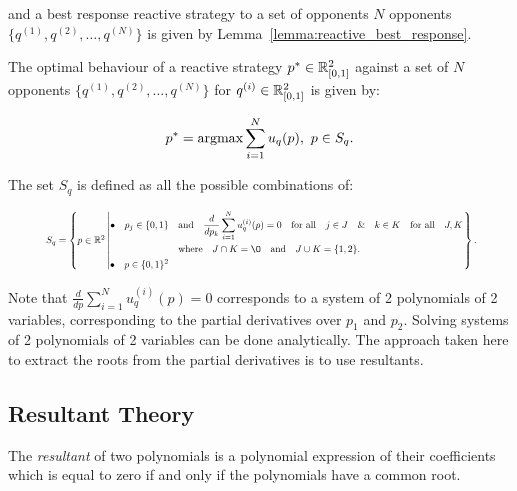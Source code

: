 and a best response reactive strategy to a set of opponents \(N\) opponents
\(\{q^{(1)}, q^{(2)}, \dots, q^{(N)} \}\) is given by
Lemma~\ref{lemma:reactive_best_response}.

\begin{lemma}\label{lemma:reactive_best_response}
    The optimal behaviour of a reactive strategy
    \(p^* \in \mathbb{R}_{[0, 1]} ^ 2\)
    against a set of \(N\) opponents \(\{q^{(1)}, q^{(2)}, \dots, q^{(N)} \}\)
    for \(q^{(i)} \in \mathbb{R}_{[0, 1]} ^ 2\) is given by:

    \[p^* = \textnormal{argmax}\sum\limits_{i=1} ^ N  u_q(p), \ p \in S_q.\]

    The set \(S_q\) is defined as all the possible combinations of:
    
    \begin{equation}\label{eq:s_q_reactive_set}
        \resizebox{.9\linewidth}{!}{ $
        S_q =
        \left\{p \in \mathbb{R} ^ 2 \left|
            \begin{aligned}
                \bullet\quad p_j \in \{0, 1\} & \quad \text{and} \quad \frac{d}{dp_k} 
                \sum\limits_{i=1} ^ N  u_q^{(i)}(p) = 0
                \quad \text{for all} \quad j \in J \quad \&  \quad k \in K  \quad \text{for all} \quad J, K \\
                & \quad \text{where} \quad J \cap K = \O \quad
                \text{and} \quad J \cup K = \{1, 2\}.\\
                \bullet\quad  p \in \{0, 1\} ^ 2
            \end{aligned}\right.
        \right\}.
        $}
    \end{equation}
\end{lemma}

Note that \(\frac{d}{dp} \sum\limits_{i=1} ^ N  u_q^{(i)}(p) = 0\) corresponds
to a system of 2 polynomials of 2 variables, corresponding to the partial
derivatives over \(p_1\) and \(p_2\). Solving systems of 2 polynomials of 2
variables can be done analytically. The approach taken here to extract the roots
from the partial derivatives is to use resultants.

\subsection{Resultant Theory}

The \textit{resultant} of two polynomials is a polynomial expression of
their coefficients which is equal to zero if and only if the polynomials have a
common root. 

